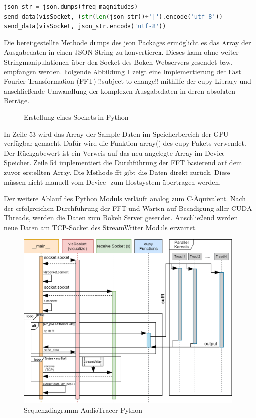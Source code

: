 \begin{lstlisting}[language=Python, frame=none]
json_str = json.dumps(freq_magnitudes)
send_data(visSocket, (str(len(json_str))+'|').encode('utf-8'))
send_data(visSocket, json_str.encode('utf-8'))
\end{lstlisting}

Die bereitgestellte Methode dumps des json Packages ermöglicht es das Array der Ausgabedaten in einen JSON-String zu konvertieren. Dieses kann ohne weiter Stringmanipulationen über den Socket des Bokeh Webservers gesendet bzw. empfangen werden.
Folgende Abbildung \ref{fig:fftpy} zeigt eine Implementierung der Fast Fourier Transformation (FFT) !!subject to change!! mithilfe der cupy-Library und anschließende Umwandlung der komplexen Ausgabedaten in deren absoluten Beträge.

\begin{figure}[t!]
	
	\caption{Erstellung eines Sockets in Python}
	\label{fig:fftpy}
\end{figure}

In Zeile 53 wird das Array der Sample Daten im Speicherbereich der GPU verfügbar gemacht. Dafür wird die Funktion array() des cupy Pakets verwendet. Der Rückgabewert ist ein Verweis auf das neu angelegte Array im Device Speicher. Zeile 54 implementiert die Durchführung der FFT basierend auf dem zuvor erstellten Array. Die Methode fft gibt die Daten direkt zurück. Diese müssen nicht manuell vom Device- zum Hostsystem übertragen werden.

Der weitere Ablauf des Python Moduls verläuft analog zum C-Äquivalent. Nach der erfolgreichen Durchführung der FFT und Warten auf Beendigung aller CUDA Threads, werden die Daten zum Bokeh Server gesendet. Anschließend werden neue Daten am TCP-Socket des StreamWriter Moduls erwartet.

\begin{figure}[hbt!]
	\centering      
	\includegraphics[scale=0.46, angle=-90]{figures/AudioTracerPython_sequence_diagram.png}
	\caption{Sequenzdiagramm AudioTracer-Python}
	\label{fig:Seq_AudioTracer_python}
\end{figure}

